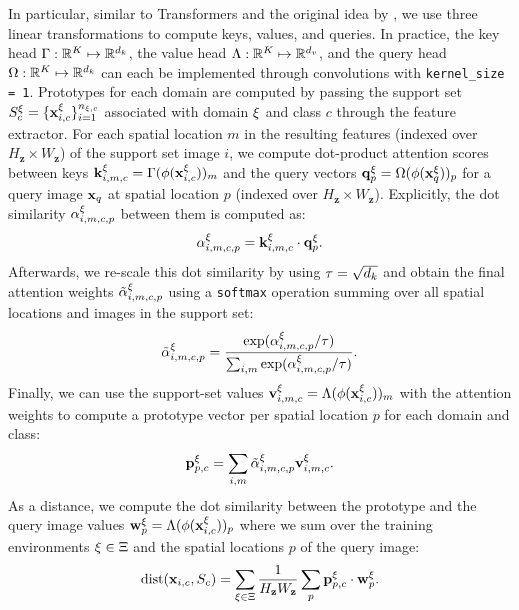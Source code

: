 In particular, similar to Transformers \citep{VaswaniSPUJGKP17} and the original idea by \citet{DoerschGZ20}, we use three linear transformations to compute keys, values, and queries. In practice, the key head $\Gamma : \mathbb{R}^{K} \mapsto \mathbb{R}^{d_{k}}$, the value head $\Lambda : \mathbb{R}^{K} \mapsto \mathbb{R}^{d_{v}}$, and the query head $\Omega : \mathbb{R}^{K} \mapsto \mathbb{R}^{d_{k}}$  can each be implemented through convolutions with \texttt{kernel\_size = 1}. Prototypes for each domain are computed by passing the support set $S_c^\xi = \{\mathbf{x}_{i,c}^\xi\}_{i=1}^{n_{\xi, c}}$ associated with domain $\xi$ and class $c$ through the feature extractor. For each spatial location $m$ in the resulting features (indexed over $H_\mathbf{z} \times W_\mathbf{z}$) of the support set image $i$, we compute dot-product attention scores between keys $\mathbf{k}_{i,m,c}^\xi = \Gamma (\phi(\mathbf{x}_{i,c}^\xi))_m$ and the query vectors $\mathbf{q}^\xi_{p} = \Omega(\phi(\mathbf{x}_{q}^\xi))_p$ for a query image $\mathbf{x}_{q}$ at spatial location $p$ (indexed over $H_\mathbf{z} \times W_\mathbf{z}$). Explicitly, the dot similarity $\alpha_{i,m,c,p}^\xi$ between them is computed as:
\begin{equation}
    \alpha_{i,m,c,p}^\xi = \mathbf{k}_{i,m,c}^\xi \cdot \mathbf{q}^\xi_{p}.
\end{equation}
Afterwards, we re-scale this dot similarity by using $\tau=\sqrt{d_{k}}$ and obtain the final attention weights $\Tilde{\alpha}_{i,m,c,p}^\xi$ using a \texttt{softmax} operation summing over all spatial locations and images in the support set:
\begin{equation}
    \Tilde{\alpha}_{i,m,c,p}^\xi = \frac{\exp(\alpha_{i,m,c,p}^\xi / \tau)}{\sum_{i,m} \exp(\alpha_{i,m,c,p}^\xi / \tau)}.
\end{equation}
Finally, we can use the support-set values $\mathbf{v}_{i,m,c}^\xi = \Lambda(\phi(\mathbf{x}_{i,c}^\xi))_m$  with the attention weights to compute a prototype vector per spatial location $p$ for each domain and class:
\begin{equation}
    \mathbf{p}_{p, c}^\xi = \sum_{i,m} \Tilde{\alpha}_{i,m,c,p}^\xi \mathbf{v}_{i,m,c}^\xi.
\end{equation}
As a distance, we compute the dot similarity between the prototype and the query image values $\mathbf{w}_{p}^\xi = \Lambda(\phi(\mathbf{x}_{i,c}^\xi))_p$ where we sum over the training environments $\xi \in \Xi$ and the spatial locations $p$ of the query image:
\begin{equation}
    \operatorname{dist}(\mathbf{x}_{i,c}, S_c) = \sum_{\xi \in \Xi} \frac{1}{H_\mathbf{z} W_\mathbf{z}} \sum_p \mathbf{p}_{p, c}^\xi \cdot  \mathbf{w}_{p}^\xi.
\end{equation}
